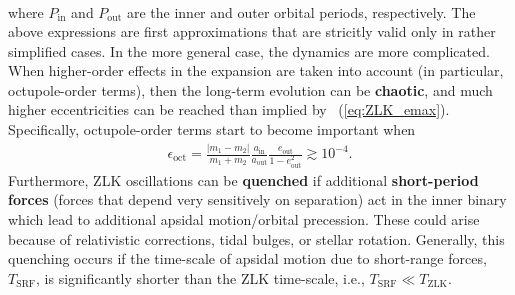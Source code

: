 \documentclass[main.tex]{subfiles}
\begin{document}
\begin{tcolorbox}[sharp corners, colback=blue!30, colframe=blue!80!blue, title=Orbital dynamics V$^9$]
{\begin{align}
\end{align}
where $P_\mathrm{in}$ and $P_\mathrm{out}$ are the inner and outer orbital periods, respectively. 
The above expressions are first approximations that are stricitly valid only in rather simplified cases. In the more general case, the dynamics are more complicated. When higher-order effects in the expansion are taken into account (in particular, octupole-order terms), then the long-term evolution can be {\bf chaotic}, and much higher eccentricities can be reached than implied by \Eq~(\ref{eq:ZLK_emax}). Specifically, octupole-order terms start to become important when
\begin{align}
\epsilon_\mathrm{oct} = \frac{|m_1-m_2|}{m_1+m_2} \frac{a_\mathrm{in}}{a_\mathrm{out}} \frac{e_\mathrm{out}}{1-e_\mathrm{out}^2} \gtrsim 10^{-4}.
\end{align}
Furthermore, ZLK oscillations can be {\bf quenched} if additional {\bf short-period forces} (forces that depend very sensitively on separation) act in the inner binary which lead to additional apsidal motion/orbital precession. These could arise because of relativistic corrections, tidal bulges, or stellar rotation. Generally, this quenching occurs if the time-scale of apsidal motion due to short-range forces, $T_\mathrm{SRF}$, is significantly shorter than the ZLK time-scale, i.e., $T_\mathrm{SRF} \ll T_\mathrm{ZLK}$. 
}  
\end{tcolorbox}
\end{document}
